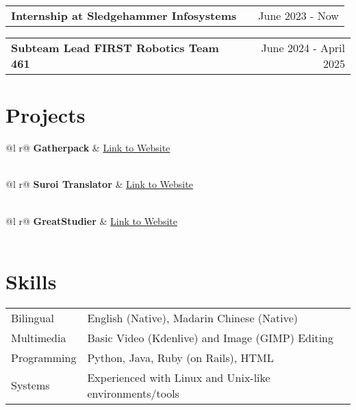 \documentclass[letter, 12pt]{article}
\makeatletter
\newenvironment{jobshort}[2]
    {
    \begin{tabularx}{\linewidth}{@{}l X r@{}}
    \textbf{#1} & \hfill &  #2 \\[3.75pt]
    \end{tabularx}
    }
    {
    }
\makeatother
\begin{document}
\begin{jobshort}{Internship at Sledgehammer Infosystems}{June 2023 - Now}
\end{jobshort}

\begin{jobshort}{Subteam Lead FIRST Robotics Team 461}{June 2024 - April 2025}
\end{jobshort}

\section{Projects}

\begin{tabularx}{\linewidth}{ @{}l r@{} }
    \textbf{Gatherpack} & \hfill \href{https://gatherpack.com}{Link to Website} \\[3.75pt]
      \\
\end{tabularx}

\begin{tabularx}{\linewidth}{ @{}l r@{} }
    \textbf{Suroi Translator} & \hfill \href{https://github.com/HasangerGames/suroi}{Link to Website} \\[3.75pt]
      \\
\end{tabularx}

\begin{tabularx}{\linewidth}{ @{}l r@{} }
    \textbf{GreatStudier} & \hfill \href{https://github.com/greatericontop/GreatStudier}{Link to Website} \\[3.75pt]
      \\
\end{tabularx}

\section{Skills}
\begin{tabularx}{\linewidth}{@{}l X@{}}
    Bilingual &  English (Native), Madarin Chinese (Native) \\
    Multimedia & Basic Video (Kdenlive) and Image (GIMP) Editing \\
    Programming & Python, Java, Ruby (on Rails), HTML \\
    Systems & Experienced with Linux and Unix-like environments/tools \\
\end{tabularx}

\vfill
{}
\end{document}
